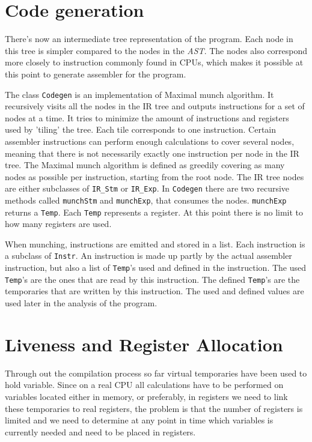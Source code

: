 \documentclass[11pt]{amsart}
\begin{document}
\section{Code generation}
There's now an intermediate tree representation of the program. Each node in this tree is simpler compared to the nodes in the \textit{AST}. The nodes also correspond more closely to instruction commonly found in CPUs, which makes it possible at this point to generate assembler for the program.

The class \texttt{Codegen} is an implementation of Maximal munch\cite{appel} algorithm. It recursively visits all the nodes in the IR tree and outputs instructions for a set of nodes at a time. It tries to minimize the amount of instructions and registers used by 'tiling' the tree. Each tile corresponds to one instruction. Certain assembler instructions can perform enough calculations to cover several nodes, meaning that there is not necessarily exactly one instruction per node in the IR tree. The Maximal munch algorithm is defined as greedily covering as many nodes as possible per instruction, starting from the root node. The IR tree nodes are either subclasses of  \texttt{IR\_Stm} or \texttt{IR\_Exp}. In \texttt{Codegen} there are two recursive methods called \texttt{munchStm} and \texttt{munchExp}, that consumes the nodes. \texttt{munchExp} returns a \texttt{Temp}. Each \texttt{Temp} represents a register. At this point there is no limit to how many registers are used.

When munching, instructions are emitted and stored in a list. Each instruction is a subclass of \texttt{Instr}. An instruction is made up partly by the actual assembler instruction, but also a list of \texttt{Temp}'s used and defined in the instruction. The used \texttt{Temp}'s are the ones that are read by this instruction. The defined \texttt{Temp}'s are the temporaries that are written by this instruction. The used and defined values are used later in the analysis of the program.

\section{Liveness and Register Allocation}
Through out the compilation process so far virtual temporaries have been used to hold variable. Since on a real CPU all calculations have to be performed on variables located either in memory, or preferably, in registers we need to link these temporaries to real registers, the problem is that the number of registers is limited and we need to determine at any point in time which variables is currently needed and need to be placed in registers.
\end{document}
